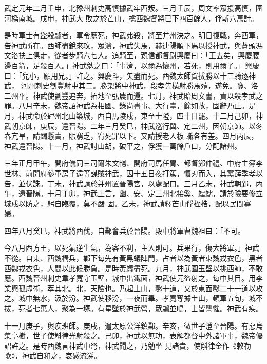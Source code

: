 \begin{pinyinscope}
 武定元年二月壬申，北豫州刺史高慎據武牢西叛。三月壬辰，周文率眾援高慎，圍河橋南城。戊申，神武大
 敗之於芒山，擒西魏督將已下四百餘人，俘斬六萬計。



 是時軍士有盜殺驢者，軍令應死，神武弗殺，將至并州決之。明日復戰，奔西軍，告神武所在。西師盡銳來攻，眾潰，神武失馬，赫連陽順下馬以授神武，與蒼頭馮文洛扶上俱走，從者步騎六七人。追騎至，親信都督尉興慶曰：「王去矣，興慶腰邊百箭，足殺百人。」神武勉之曰：「事濟，以爾為懷州，若死，則用爾子。」興慶曰：「兒小，願用兄。」許之。興慶斗，矢盡而死。西魏太師賀拔勝以十三騎逐神武，
 河州刺史劉豐射中其二。勝槊將中神武，段孝先橫射勝馬殪，遂免。豫、洛二州平。神武使劉豐追奔，拓地至弘農而還。七月，神武貽周文書，責以殺孝武之罪。八月辛未，魏帝詔神武為相國、錄尚書事、大行臺，餘如故，固辭乃止。是月，神武命於肆州北山築城，西自馬陵戍，東至士隥，四十日罷。十二月己卯，神武朝京師，庚辰，還晉陽。二年三月癸巳，神武巡行冀、定二州，因朝京師。以冬春亢旱，請蠲懸責，賑窮乏，宥死罪以下。又請授老人板
 職各有差。四月丙辰，神武還晉陽。十一月，神武討山胡，破平之，俘獲一萬餘戶口，分配諸州。



 三年正月甲午，開府儀同三司爾朱文暢、開府司馬任胄、都督鄭仲禮、中府主簿李世林、前開府參軍房子遠等謀賊神武，因十五日夜打簇，懷刃而入，其黨薛季孝以告，並伏誅。丁未，神武請於并州置晉陽宮，以處配口。三月乙未，神武朝鄴，丙午，還晉陽。十月丁卯，神武上言，幽、安、定三州北接奚、蠕蠕，請於險要修立城戍以防之，躬自臨覆，莫不嚴
 固。乙未，神武請釋芒山俘桎梏，配以民間寡婦。



 四年八月癸巳，神武將西伐，自鄴會兵於晉陽。殿中將軍曹魏祖曰：「不可。



 今八月西方王，以死氣逆生氣，為客不利，主人則可。兵果行，傷大將軍。」神武不從。自東、西魏構兵，鄴下每先有黃黑蟻陣鬥，占者以為黃者東魏戎衣色，黑者西魏戎衣色，人間以此候勝負。是時黃蟻盡死。九月，神武圍玉壁以挑西師，不敢應。西魏晉州刺史韋孝寬守玉壁，城中出鐵面，神武使元盜射之，每中其目。用李
 業興孤虛術，萃其北。北，天險也。乃起土山，鑿十道，又於東面鑿二十一道以攻之。城中無水，汲於汾。神武使移汾，一夜而畢。孝寬奪據土山，頓軍五旬，城不拔，死者七萬人，聚為一塚。有星墜於神武營，眾驢並鳴，士皆讋懼。神武有疾。



 十一月庚子，輿疾班師。庚戌，遣太原公洋鎮鄴。辛亥，徵世子澄至晉陽。有惡烏集亭樹，世子使斛律光射殺之。己卯，神武以無功，表解都督中外諸軍事，魏帝優詔許之。是時西魏言神武中弩，神武聞之，乃勉坐
 見諸貴，使斛律金作《敕勒歌》，神武自和之，哀感流涕。




\end{pinyinscope}
